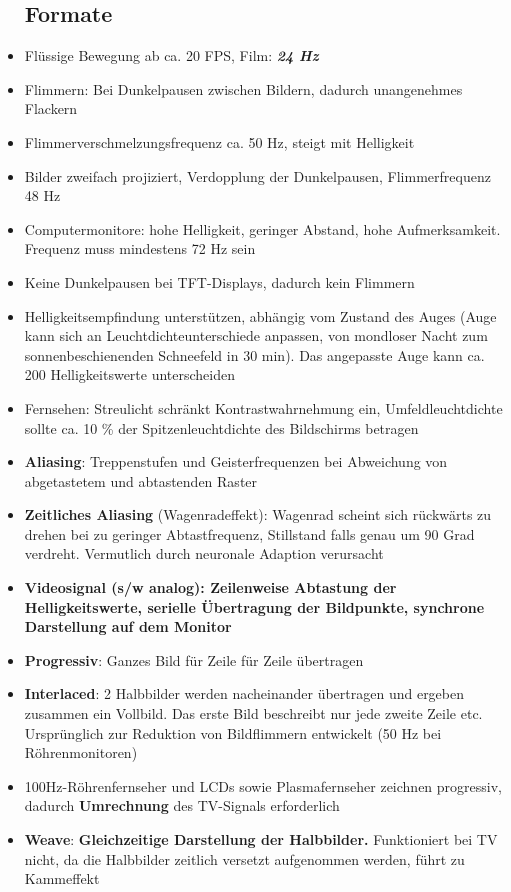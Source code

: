 \documentclass[12pt,landscape]{article}
\begin{document}
\begin{multicols}{3}
\begin{itemize}
\subsection{Formate}
\item Flüssige Bewegung ab ca. 20 FPS, Film: \textit{\textbf{24 Hz}}
\item Flimmern: Bei Dunkelpausen zwischen Bildern, dadurch unangenehmes Flackern
\item Flimmerverschmelzungsfrequenz ca. 50 Hz, steigt mit Helligkeit
\item Bilder zweifach projiziert, Verdopplung der Dunkelpausen, Flimmerfrequenz 48 Hz
\item Computermonitore: hohe Helligkeit, geringer Abstand, hohe Aufmerksamkeit. Frequenz muss mindestens 72 Hz sein
\item Keine Dunkelpausen bei TFT-Displays, dadurch kein Flimmern
\item Helligkeitsempfindung unterstützen, abhängig vom Zustand des Auges (Auge kann sich an Leuchtdichteunterschiede anpassen, von mondloser Nacht zum sonnenbeschienenden Schneefeld in 30 min). Das angepasste Auge kann ca. 200 Helligkeitswerte unterscheiden
\item Fernsehen: Streulicht schränkt Kontrastwahrnehmung ein, Umfeldleuchtdichte sollte ca. 10 \% der Spitzenleuchtdichte des Bildschirms betragen
\item \textbf{Aliasing}: Treppenstufen und Geisterfrequenzen bei Abweichung von abgetastetem und abtastenden Raster
\item \textbf{Zeitliches Aliasing} (Wagenradeffekt): Wagenrad scheint sich rückwärts zu drehen bei zu geringer Abtastfrequenz, Stillstand falls genau um 90 Grad  verdreht. Vermutlich durch neuronale Adaption verursacht
\item \textbf{Videosignal (s/w analog): Zeilenweise Abtastung der Helligkeitswerte, serielle Übertragung der Bildpunkte, synchrone Darstellung auf dem Monitor}
\item \textbf{Progressiv}: Ganzes Bild für Zeile für Zeile übertragen
\item \textbf{Interlaced}: 2 Halbbilder werden nacheinander übertragen und ergeben zusammen ein Vollbild. Das erste Bild beschreibt nur jede zweite Zeile etc. Ursprünglich zur Reduktion von Bildflimmern entwickelt (50 Hz bei Röhrenmonitoren)
\item 100Hz-Röhrenfernseher und LCDs sowie Plasmafernseher zeichnen progressiv, dadurch \textbf{Umrechnung} des TV-Signals erforderlich
\item \textbf{Weave}: \textbf{Gleichzeitige Darstellung der Halbbilder.} Funktioniert bei TV nicht, da die Halbbilder zeitlich versetzt aufgenommen werden, führt zu Kammeffekt

\end{itemize}
\end{multicols}
\end{document}
